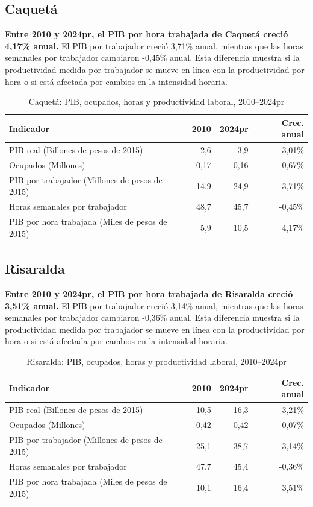 \subsection{Caquetá}
\textbf{Entre 2010 y 2024pr, el PIB por hora trabajada de Caquetá creció 4,17\% anual.} El PIB por trabajador creció 3,71\% anual, mientras que las horas semanales por trabajador cambiaron -0,45\% anual. Esta diferencia muestra si la productividad medida por trabajador se mueve en línea con la productividad por hora o si está afectada por cambios en la intensidad horaria.
\begin{table}[H]
\centering
\caption{Caquetá: PIB, ocupados, horas y productividad laboral, 2010--2024pr}
\label{tab:departamento_caqueta_productividad}
\scriptsize
\begin{tabular}{lrrr}
\toprule
Indicador & 2010 & 2024pr & Crec. anual \\
\midrule
PIB real (Billones de pesos de 2015) & 2,6 & 3,9 & 3,01\% \\
Ocupados (Millones) & 0,17 & 0,16 & -0,67\% \\
PIB por trabajador (Millones de pesos de 2015) & 14,9 & 24,9 & 3,71\% \\
Horas semanales por trabajador & 48,7 & 45,7 & -0,45\% \\
PIB por hora trabajada (Miles de pesos de 2015) & 5,9 & 10,5 & 4,17\% \\
\bottomrule
\end{tabular}
\end{table}

\subsection{Risaralda}
\textbf{Entre 2010 y 2024pr, el PIB por hora trabajada de Risaralda creció 3,51\% anual.} El PIB por trabajador creció 3,14\% anual, mientras que las horas semanales por trabajador cambiaron -0,36\% anual. Esta diferencia muestra si la productividad medida por trabajador se mueve en línea con la productividad por hora o si está afectada por cambios en la intensidad horaria.
\begin{table}[H]
\centering
\caption{Risaralda: PIB, ocupados, horas y productividad laboral, 2010--2024pr}
\label{tab:departamento_risaralda_productividad}
\scriptsize
\begin{tabular}{lrrr}
\toprule
Indicador & 2010 & 2024pr & Crec. anual \\
\midrule
PIB real (Billones de pesos de 2015) & 10,5 & 16,3 & 3,21\% \\
Ocupados (Millones) & 0,42 & 0,42 & 0,07\% \\
PIB por trabajador (Millones de pesos de 2015) & 25,1 & 38,7 & 3,14\% \\
Horas semanales por trabajador & 47,7 & 45,4 & -0,36\% \\
PIB por hora trabajada (Miles de pesos de 2015) & 10,1 & 16,4 & 3,51\% \\
\bottomrule
\end{tabular}
\end{table}

